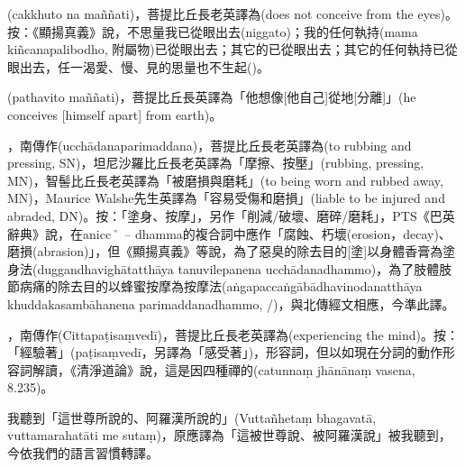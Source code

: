 \startitemgroup[noteitems]
\item{}(cakkhuto na maññati)，菩提比丘長老英譯為(does not conceive from the eyes)。按：《顯揚真義》說，不思量我已從眼出去(niggato)；我的任何執持(mama kiñcanapalibodho, 附屬物)已從眼出去；其它的已從眼出去；其它的任何執持已從眼出去，任一渴愛、慢、見的思量也不生起()。
\item{}(pathavito maññati)，菩提比丘長英譯為「他想像[他自己]從地[分離]」(he conceives [himself apart] from earth)。
\stopitemgroup

\startitemgroup[noteitems]
\item{}，南傳作(ucchādanaparimaddana)，菩提比丘長老英譯為(to rubbing and pressing, SN)，坦尼沙羅比丘長老英譯為「摩擦、按壓」(rubbing, pressing, MN)，智髻比丘長老英譯為「被磨損與磨耗」(to being worn and rubbed away, MN)，Maurice Walshe先生英譯為「容易受傷和磨損」(liable to be injured and abraded, DN)。按：「塗身、按摩」，另作「削減/破壞、磨碎/磨耗」，PTS《巴英辭典》說，在anicc˚ -- dhamma的複合詞中應作「腐蝕、朽壞(erosion，decay)、磨損(abrasion)」，但《顯揚真義》等說，為了惡臭的除去目的[塗]以身體香膏為塗身法(duggandhavighātatthāya tanuvilepanena ucchādanadhammo)，為了肢體肢節病痛的除去目的以蜂蜜按摩為按摩法(aṅgapaccaṅgābādhavinodanatthāya khuddakasambāhanena parimaddanadhammo, /)，與北傳經文相應，今準此譯。
\stopitemgroup

\startitemgroup[noteitems]
\item{}，南傳作(Cittapaṭisaṃvedī)，菩提比丘長老英譯為(experiencing the mind)。按：「經驗著」(paṭisaṃvedī，另譯為「感受著」)，形容詞，但以如現在分詞的動作形容詞解讀，《清淨道論》說，這是因四種禪的(catunnaṃ jhānānaṃ vasena, 8.235)。
\stopitemgroup

\startitemgroup[noteitems]
\item{}我聽到「這世尊所說的、阿羅漢所說的」(Vuttañhetaṃ bhagavatā, vuttamarahatāti me sutaṃ)，原應譯為「這被世尊說、被阿羅漢說」被我聽到，今依我們的語言習慣轉譯。
\stopitemgroup

